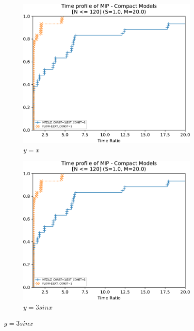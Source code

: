 \begin{figure}
	\centering
	\begin{subfigure}[b]{0.49\textwidth}
		\centering
		\includegraphics[width=\textwidth]{./Imgs/perfprof-tsp-example/time-ratio20.0.cropped.pdf}
		\caption{$y=x$}
		\label{fig:test-a}
	\end{subfigure}
	\hfill
	\begin{subfigure}[b]{0.49\textwidth}
		\centering
		\includegraphics[width=\textwidth]{./Imgs/perfprof-tsp-example/time-ratio20.0.cropped.pdf}
		\caption{$y=3sinx$}
		\label{fig:test-b}
	\end{subfigure}


\end{figure}
